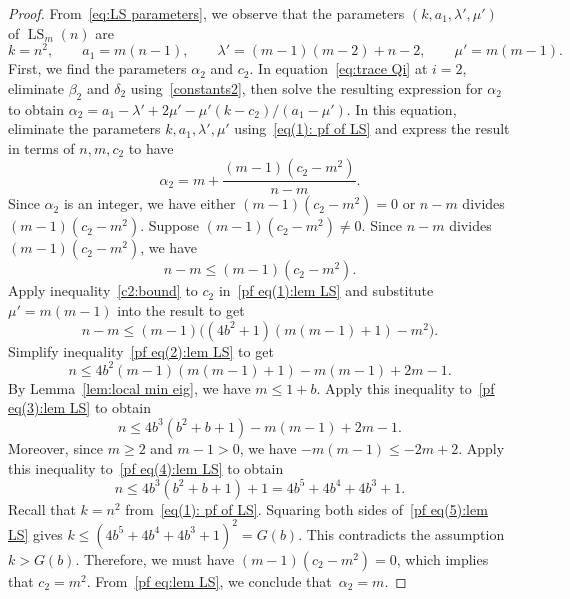 \begin{proof} 
From~\eqref{eq:LS parameters}, we observe that the parameters $(k,a_1,\lambda', \mu')$ of $\operatorname{LS}_m(n)$ are 
\begin{equation}\label{eq(1): pf of LS}
	k= n^2, \qquad a_1 =m(n-1), \qquad \lambda' = (m-1)(m-2) +n-2, \qquad \mu' = m(m-1).
\end{equation}
First, we find the parameters $\alpha_2$ and $c_2$.
In equation~\eqref{eq:trace Qi} at $i=2$, eliminate $\beta_2$ and $\delta_2$ using~\eqref{constants2}, then solve the resulting expression for $\alpha_2$ to obtain $\alpha_2 = a_1-\lambda'+2\mu' - {\mu'(k-c_2)}/({a_1-\mu'}).$
In this equation, eliminate the parameters $k, a_1, \lambda', \mu'$ using~\eqref{eq(1): pf of LS} and express the result in terms of $n, m, c_2$ to have 
\begin{equation}\label{pf eq:lem LS}
	\alpha_2 = m + \frac{(m-1)(c_2-m^2)}{n-m}.
\end{equation}
Since $\alpha_2$ is an integer, we have either $(m-1)(c_2-m^2)=0$ or $n-m$ divides \mbox{$(m-1)(c_2-m^2)$}.
Suppose $(m-1)(c_2-m^2) \neq 0$.
Since $n-m$ divides $(m-1)(c_2-m^2)$, we have
\begin{equation}\label{pf eq(1):lem LS}
	n-m \leqslant (m-1)(c_2-m^2).
\end{equation}
Apply inequality~\eqref{c2:bound} to $c_2$ in~\eqref{pf eq(1):lem LS} and substitute $\mu'=m(m-1)$ into the result to get
\begin{equation}\label{pf eq(2):lem LS}
	n - m \leqslant (m-1) \big((4b^2+1)(m(m-1)+1) - m^2 \big).
\end{equation}
Simplify inequality~\eqref{pf eq(2):lem LS} to get
\begin{equation}\label{pf eq(3):lem LS}
	n \leqslant 4b^2 (m-1)(m(m-1)+1) -m(m-1) +2m-1. 
\end{equation}
By Lemma~\ref{lem:local min eig}, we have $m \leqslant 1+b$.
Apply this inequality to~\eqref{pf eq(3):lem LS} to obtain
\begin{equation}\label{pf eq(4):lem LS}
	n \leqslant 4b^3 (b^2+b+1) -m(m-1) +2m-1. 
\end{equation} 
Moreover, since $m \geqslant 2$ and $m-1>0$, we have $-m(m-1) \leqslant -2m+2$.
Apply this inequality to~\eqref{pf eq(4):lem LS} to obtain
\begin{equation}\label{pf eq(5):lem LS}
	n \leqslant 4b^3 (b^2+b+1) +1 = 4b^5 + 4b^4 + 4b^3 + 1. 
\end{equation} 
Recall that $k=n^2$ from~\eqref{eq(1): pf of LS}.
Squaring both sides of~\eqref{pf eq(5):lem LS} gives $k \leqslant (4b^5 + 4b^4 + 4b^3 + 1)^2=G(b)$.
This contradicts the assumption $k > G(b)$.
Therefore, we must have $(m-1)(c_2-m^2)=0$, which implies that $c_2=m^2$.
From~\eqref{pf eq:lem LS}, we conclude that~$\alpha_2=m$.


\end{proof}
